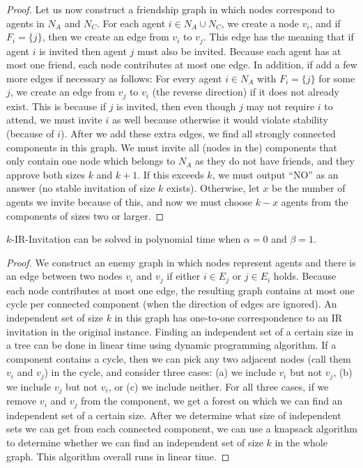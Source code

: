 \begin{proof}
Let us now construct a friendship graph in which nodes correspond to agents in $N_A$ and $N_C$. For each agent $i \in N_A \cup N_C$, we create a node $v_i$, and if $F_i = \{j\}$, then we create an edge from $v_i$ to $v_j$. This edge has the meaning that if agent $i$ is invited then agent $j$ must also be invited. Because each agent has at most one friend, each node contributes at most one edge. In addition, if add a few more edges if necessary as follows: For every agent $i \in N_A$ with $F_i = \{j\}$ for some $j$, we create an edge from $v_j$ to $v_i$ (the reverse direction) if it does not already exist. This is because if $j$ is invited, then even though $j$ may not require $i$ to attend, we must invite $i$ as well because otherwise it would violate stability (because of $i$). After we add these extra edges, we find all strongly connected components in this graph. We must invite all (nodes in the) components that only contain one node which belongs to $N_A$ as they do not have friends, and they approve both sizes $k$ and $k+1$. If this exceeds $k$, we must output ``NO'' as an answer (no stable invitation of size $k$ exists). Otherwise, let $x$ be the number of agents we invite because of this, and now we must choose $k-x$ agents from the components of sizes two or larger. 


\end{proof}

\begin{theorem} \label{SIP:thm:easiness_IR_a0_b1}
	$k$-IR-Invitation can be solved in polynomial time when $\alpha =0$ and $\beta = 1$.
\end{theorem} 
\begin{proof}
	We construct an enemy graph in which nodes represent agents and there is an edge between two nodes $v_i$ and $v_j$ if either $i \in E_j$ or $j\in E_i$ holds. Because each node contributes at most one edge, the resulting graph contains at most one cycle per connected component (when the direction of edges are ignored). An independent set of size $k$ in this graph has one-to-one correspondence to an IR invitation in the original instance. Finding an independent set of a certain size in a tree can be done in linear time using dynamic programming algorithm. If a component contains a cycle, then we can pick any two adjacent nodes (call them $v_i$ and $v_j$) in the cycle, and consider three cases: (a) we include $v_i$ but not $v_j$, (b) we include $v_j$ but not $v_i$, or (c) we include neither. For all three cases, if we remove $v_i$ and $v_j$ from the component, we get a forest on which we can find an independent set of a certain size. After we determine what size of independent sets we can get from each connected component, we can use a knapsack algorithm to determine whether we can find an independent set of size $k$ in the whole graph. This algorithm overall runs in linear time.
\end{proof}


